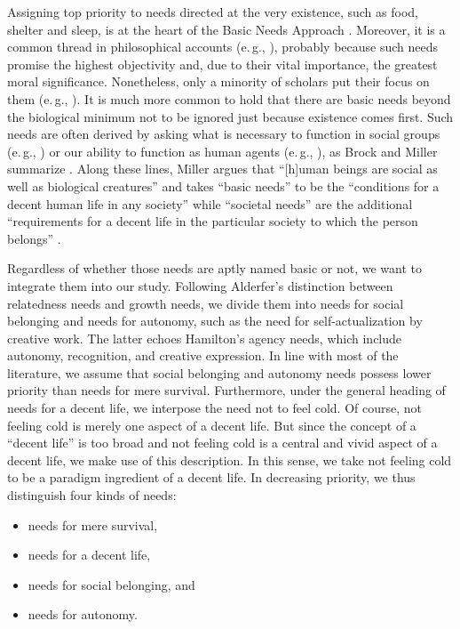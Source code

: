 \documentclass[10pt,letterpaper]{article}
\begin{document}
Assigning top priority to needs directed at the very existence, such as food, shelter and sleep, is at the heart of the Basic Needs Approach \cite{jolly_world_1976,ghai_basic_1978}.
Moreover, it is a common thread in philosophical accounts (e.\,g., \cite{braybrooke_meeting_1987,wiggins_needs_1987,wiggins_what_1998}), probably because such needs promise the highest objectivity and, due to their vital importance, the greatest moral significance.
Nonetheless, only a minority of scholars put their focus on them (e.\,g., \cite{daniels_just_1985}).
It is much more common to hold that there are basic needs beyond the biological minimum not to be ignored just because existence comes first.
Such needs are often derived by asking what is necessary to function in social groups (e.\,g., \cite{braybrooke_meeting_1987,thomson_need_1987,wiggins_what_1998}) or our ability to function as human agents (e.\,g., \cite{copp_equality_1998,gewirth_reason_1978,oneill_rights_1998,shue_basic_1996}), as Brock and Miller summarize \cite{brock_needs_2019}.
Along these lines, Miller argues that ``[h]uman beings are social as well as biological creatures'' and takes ``basic needs'' to be the ``conditions for a decent human life in any society'' while ``societal needs'' are the additional ``requirements for a decent life in the particular society to which the person belongs'' \cite[p. 3]{miller_national_2007}.

Regardless of whether those needs are aptly named basic or not, we want to integrate them into our study.
Following Alderfer's distinction between relatedness needs and growth needs, we divide them into needs for social belonging and needs for autonomy, such as the need for self-actualization by creative work.
The latter echoes Hamilton's agency needs, which include autonomy, recognition, and creative expression.
In line with most of the literature, we assume that social belonging and autonomy needs possess lower priority than needs for mere survival.
Furthermore, under the general heading of needs for a decent life, we interpose the need not to feel cold.
Of course, not feeling cold is merely one aspect of a decent life.
But since the concept of a ``decent life'' is too broad and not feeling cold is a central and vivid aspect of a decent life, we make use of this description.
In this sense, we take not feeling cold to be a paradigm ingredient of a decent life.
In decreasing priority, we thus distinguish four kinds of needs:

\begin{itemize}
   \item needs for mere survival,
   \item needs for a decent life,
   \item needs for social belonging, and
   \item needs for autonomy.
\end{itemize}
\end{document}
